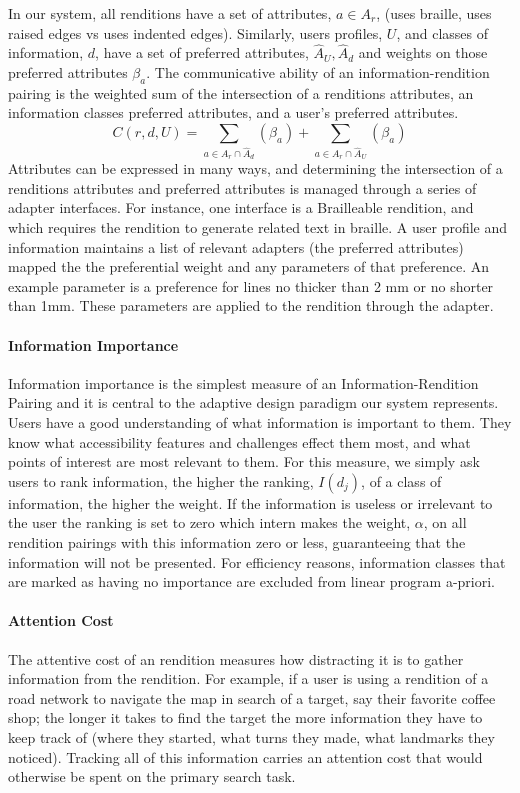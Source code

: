 In our system, all renditions have a set of attributes, $a \in A_r$, (\eg uses braille, uses raised edges vs uses indented edges). Similarly, users profiles, $U$, and classes of information, $d$, have a set of preferred attributes, $\hat{A}_U,\hat{A}_d$ and weights on those preferred attributes $\beta_a$. The communicative ability of an information-rendition pairing is the weighted sum of the intersection of a renditions attributes, an information classes preferred attributes, and a user's preferred attributes. 
\begin{equation}
\label{eq::communicability}
C(r,d,U) = \sum_{a\in A_r \cap \hat{A}_d}(\beta_a) +  \sum _{a\in A_r \cap \hat{A}_U}(\beta_a)
\end{equation}
Attributes can be expressed in many ways, and determining the intersection of a renditions attributes and preferred attributes is managed through a series of adapter interfaces. For instance, one interface is a Brailleable rendition, and which requires the rendition to generate related text in braille. A user profile and information maintains a list of relevant adapters (\ie the preferred attributes) mapped the the preferential weight and any parameters of that preference. An example parameter is a preference for lines no thicker than 2 mm or no shorter than 1mm. These parameters are applied to the rendition through the adapter. 

\paragraph{Information Importance}
Information importance is the simplest measure of an Information-Rendition Pairing and it is central to the adaptive design paradigm our system represents. Users have a good understanding of what information is important to them. They know what accessibility features and challenges effect them most, and what points of interest are most relevant to them. For this measure, we simply ask users to rank information, the higher the ranking, $I(d_j)$, of a class of information, the higher the weight. If the information is useless or irrelevant to the user the ranking is set to zero which intern makes the weight, $\alpha$, on all rendition pairings with this information zero or less, guaranteeing that the information will not be presented. For efficiency reasons, information classes that are marked as having no importance are excluded from linear program a-priori. 

\paragraph{Attention Cost}
The attentive cost of an rendition measures how distracting it is to gather information from the rendition. For example, if a user is using a rendition of a road network to navigate the map in search of a target, say their favorite coffee shop;  the longer it takes to find the target the more information they have to keep track of (\eg where they started, what turns they made, what landmarks they noticed). Tracking all of this information carries an attention cost that would otherwise be spent on the primary search task.

